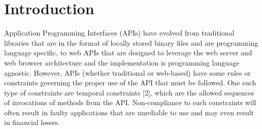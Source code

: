 \section{Introduction}
\label{sec:introduction}




Application Programming Interfaces (APIs) have evolved from traditional libraries that are in the format of locally stored binary files and are programming language specific,
to web APIs that are designed to leverage the web server and web browser architecture and the implementation is programming language agnostic.
However, APIs (whether traditional or web-based) have some rules or constraints governing the proper use of the API that must be followed.
One such type of constraints are temporal constraints [2], which are the allowed sequences of invocations of methods from the API.
Non-compliance to such constraints will often result in faulty applications that are unreliable to use and may even result in financial losses.


